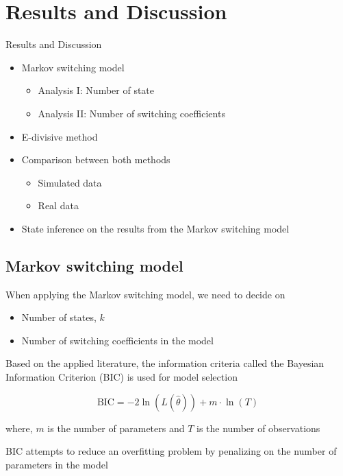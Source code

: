 \documentclass{beamer}
\begin{document}
\section{Results and Discussion}

\begin{frame}
	Results and Discussion
	
	\begin{itemize}
		\item Markov switching model
		\begin{itemize}
			\item Analysis I: Number of state
			\item Analysis II: Number of switching coefficients
		\end{itemize}
		
		\item E-divisive method
		\item Comparison between both methods
		\begin{itemize}
			\item Simulated data
			\item Real data
		\end{itemize}
		
		\item State inference on the results from the Markov switching model
	\end{itemize}
	
\end{frame}
\subsection{Markov switching model}
\begin{frame}
When applying the Markov switching model, we need to decide on
\begin{itemize}
	\item Number of states, $k$
	\item Number of switching coefficients in the model
\end{itemize}
\vspace{1em}

Based on the applied literature, the information criteria called the Bayesian Information Criterion (BIC) is used for model selection

$$\mathrm{BIC}=-2\ln(L(\hat{\theta}))+m\cdot\ln(T)$$

\footnotesize{where, $m$ is the number of parameters and $T$ is the number of observations}
\vspace{1em}

\normalsize{BIC attempts to reduce an overfitting problem by penalizing on the number of parameters in the model}

\end{frame}
\end{document}
